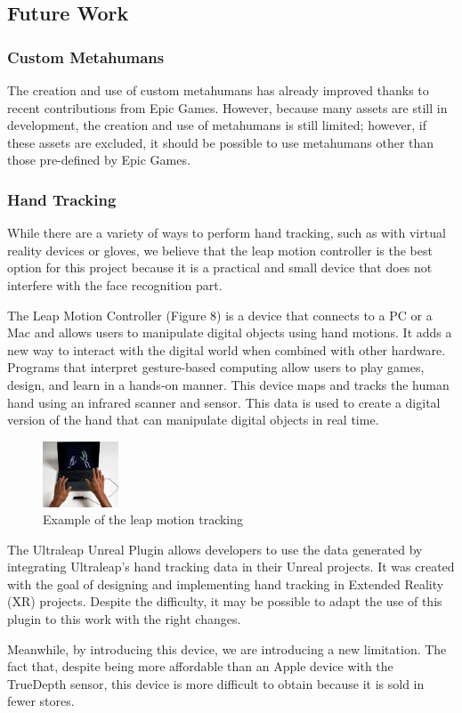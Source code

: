 \subsection{Future Work}
\subsubsection{Custom Metahumans}
The creation and use of custom metahumans has already improved thanks to recent contributions from Epic Games. However, because many assets are still in development, the creation and use of metahumans is still limited; however, if these assets are excluded, it should be possible to use metahumans other than those pre-defined by Epic Games.

\subsubsection{Hand Tracking}
While there are a variety of ways to perform hand tracking, such as with virtual reality devices or gloves, we believe that the leap motion controller is the best option for this project because it is a practical and small device that does not interfere with the face recognition part.

The Leap Motion Controller (Figure 8) is a device that connects to a PC or a Mac and allows users to manipulate digital objects using hand motions. It adds a new way to interact with the digital world when combined with other hardware. Programs that interpret gesture-based computing allow users to play games, design, and learn in a hands-on manner. This device maps and tracks the human hand using an infrared scanner and sensor. This data is used to create a digital version of the hand that can manipulate digital objects in real time.

\begin{figure}[h!]
\includegraphics[width=0.2\textwidth]{figures/leapMotion.jpg}
\centering
\caption{Example of the leap motion tracking}
\end{figure}

The Ultraleap Unreal Plugin \cite{ULT} allows developers to use the data generated by integrating Ultraleap's hand tracking data in their Unreal projects. It was created with the goal of designing and implementing hand tracking in Extended Reality (XR) projects. Despite the difficulty, it may be possible to adapt the use of this plugin to this work with the right changes.

Meanwhile, by introducing this device, we are introducing a new limitation. The fact that, despite being more affordable than an Apple device with the TrueDepth sensor, this device is more difficult to obtain because it is sold in fewer stores.

